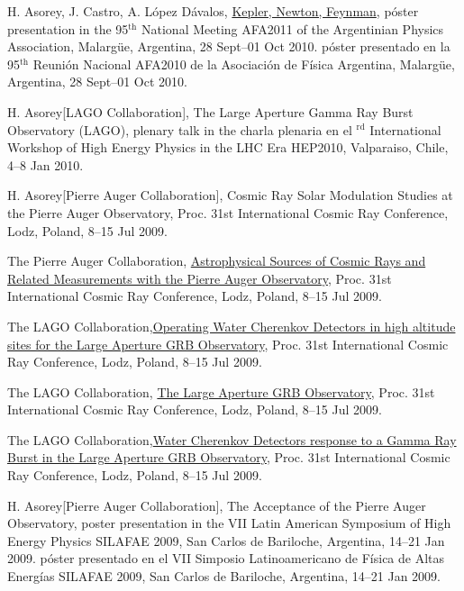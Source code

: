 \begin{etaremune}
\item {}H. Asorey, J. Castro, A. López Dávalos,
\href{http://95rnf.afa.webfactional.com/tex\_files/Resumenes/EF/asorey.pdf}{{Kepler,
Newton, Feynman}}, 
\ifeng
póster presentation in the 95$^{\mathrm{th}}$ National Meeting AFA2011 of the Argentinian Physics Association, Malargüe, Argentina, 28 Sept--01 Oct 2010.
\else
póster presentado en la 95$^{\mathrm{th}}$ Reunión Nacional AFA2010 de la Asociación de Física Argentina, Malargüe, Argentina, 28 Sept--01 Oct 2010.
\fi

\item {}H. Asorey[LAGO Collaboration], {{The Large Aperture Gamma Ray Burst Observatory (LAGO)}}, 
\ifeng
plenary talk in the 
\else
charla plenaria en el 
$^{\mathrm{rd}}$ International Workshop of High Energy Physics in the LHC Era HEP2010, Valparaiso, Chile, 4--8 Jan 2010.

\item {}H. Asorey[Pierre Auger Collaboration], {{Cosmic Ray Solar
Modulation Studies at the Pierre Auger Observatory}}, \en Proc.
31st
International Cosmic Ray Conference, Lodz, Poland, 8--15 Jul 2009.

\item {}The Pierre Auger Collaboration,
\href{http://arxiv.org/abs/0906.2347}{{Astrophysical Sources of Cosmic
Rays and Related Measurements with the Pierre Auger Observatory}}, \en Proc.
31st International Cosmic Ray Conference, Lodz, Poland, 8--15 Jul 2009.

\item {}The LAGO Collaboration,\href{http://arxiv.org/abs/0906.0814}{{Operating Water Cherenkov Detectors in high altitude sites for the Large Aperture GRB Observatory}}, \en Proc.
31st International Cosmic Ray Conference, Lodz, Poland, 8--15 Jul 2009.

\item {}The LAGO Collaboration,
\href{http://arxiv.org/abs/0906.0816}{{The Large Aperture GRB
Observatory}}, \en Proc.
31st International Cosmic Ray Conference, Lodz,
Poland, 8--15 Jul 2009.

\item {}The LAGO Collaboration,\href{http://arxiv.org/abs/0906.0820}{{Water Cherenkov Detectors response to a Gamma Ray Burst in the Large Aperture GRB Observatory}}, \en Proc.
31st International Cosmic Ray Conference, Lodz, Poland, 8--15 Jul 2009.
\item {}H. Asorey[Pierre Auger Collaboration], {{The Acceptance of the
Pierre Auger Observatory}}, 
\ifeng
poster presentation in the VII Latin American Symposium of High Energy Physics SILAFAE 2009, San Carlos de Bariloche, Argentina, 14--21 Jan 2009.
\else
póster presentado en el VII Simposio Latinoamericano de Física de Altas Energías SILAFAE 2009, San Carlos de Bariloche, Argentina, 14--21 Jan 2009.
\fi


\end{etaremune}
